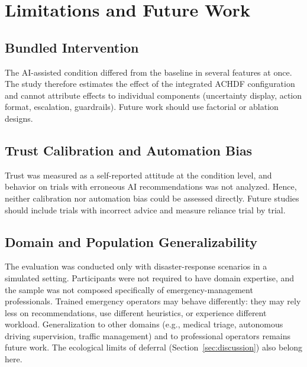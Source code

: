 \documentclass[journal]{IEEEtran}
\theoremstyle{plain}
\theoremstyle{definition}
\begin{document}
    \section{Limitations and Future Work}
    \label{sec:limitations}

    \subsection{Bundled Intervention}
    The AI-assisted condition differed from the baseline in several features at once. The study therefore estimates the effect of the integrated ACHDF configuration and cannot attribute effects to individual components (uncertainty display, action format, escalation, guardrails). Future work should use factorial or ablation designs.

    \subsection{Trust Calibration and Automation Bias}
    Trust was measured as a self-reported attitude at the condition level, and behavior on trials with erroneous AI recommendations was not analyzed. Hence, neither calibration nor automation bias could be assessed directly. Future studies should include trials with incorrect advice and measure reliance trial by trial.

    \subsection{Domain and Population Generalizability}
    The evaluation was conducted only with disaster-response scenarios in a simulated setting. Participants were not required to have domain expertise, and the sample was not composed specifically of emergency-management professionals. Trained emergency operators may behave differently: they may rely less on recommendations, use different heuristics, or experience different workload. Generalization to other domains (e.g., medical triage, autonomous driving supervision, traffic management) and to professional operators remains future work. The ecological limits of deferral (Section~\ref{sec:discussion}) also belong here.
\end{document}
